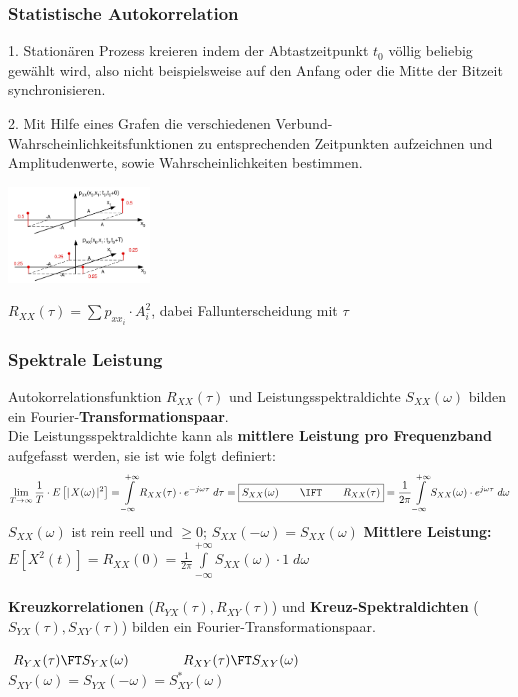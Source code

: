 \subsubsection{Statistische Autokorrelation}
	\parbox{5cm}{1. Stationären Prozess kreieren indem der Abtastzeitpunkt $t_0$ völlig beliebig gewählt wird, also nicht beispielsweise auf den Anfang oder die Mitte der Bitzeit synchronisieren.}
	\hspace{0.25cm}
	\parbox{5cm}{2. Mit Hilfe eines Grafen die verschiedenen Verbund-Wahrscheinlichkeitsfunktionen zu entsprechenden Zeitpunkten aufzeichnen und Amplitudenwerte, sowie Wahrscheinlichkeiten bestimmen.}
	\hspace{0.25cm}
	\parbox{3.75cm}{\includegraphics[width = 3.75cm]{./bilder/07_stat_autokorr}}
	\hspace{0.25cm}
	\parbox{4cm}{$R_{XX}(\tau)=\sum p_{xx_i} \cdot A_i^2$, dabei Fallunterscheidung mit $\tau$}
	

\subsubsection{Spektrale Leistung}
Autokorrelationsfunktion $R_{XX}(\tau)$ und Leistungsspektraldichte $S_{XX}(\omega)$ bilden ein
Fourier-\textbf{Transformationspaar}. \\ Die Leistungsspektraldichte kann als \textbf{mittlere Leistung pro Frequenzband }aufgefasst werden, sie ist
wie folgt definiert:                             
        $$ \lim\limits_{T \rightarrow \infty} \frac{1}{T} \cdot E\left[  \mid\!
        X(\omega) \!\mid^{2}\right] = \int\limits_{-\infty}^{+\infty}
        R_{XX}(\tau) \cdot e^{-j\omega\tau} \; d\tau = \boxed{S_{XX}(\omega)
        \qquad \IFT \qquad R_{XX}(\tau)} = \frac{1}{2\pi}
        \int\limits_{-\infty}^{+\infty}S_{XX}(\omega) \cdot e^{j\omega\tau} \;
        d\omega$$ 
        $S_{XX}(\omega)$ ist rein reell und $\geq 0$; $S_{XX}(-\omega) = S_{XX}(\omega)$ \qquad
        \textbf{Mittlere Leistung:} $ E[X^2(t)] = R_{XX}(0) = \frac{1}{2\pi} \int\limits_{-\infty}^{+\infty}S_{XX}(\omega)\cdot1 \; d\omega $\\ \\
\textbf{Kreuzkorrelationen} ($R_{YX}(\tau), R_{XY}(\tau)$) und \textbf{Kreuz-Spektraldichten} ($S_{YX}(\tau),
S_{XY}(\tau)$) bilden ein Fourier-Transformationspaar.
\begin{center}
	$R_{YX}(\tau) \FT S_{YX}(\omega) \qquad \qquad R_{XY}(\tau) \FT S_{XY}(\omega)$\\
	$S_{XY}(\omega) = S_{YX}(-\omega) = S_{XY}^{\ast}(\omega)$
\end{center}

